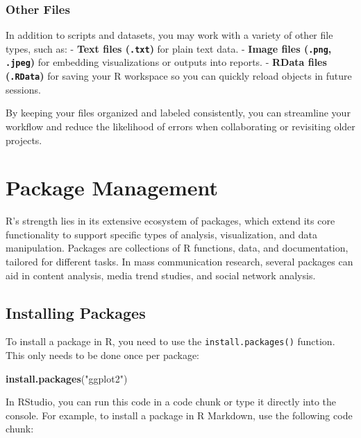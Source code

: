 \documentclass[
]{book}
\newenvironment{Shaded}{\begin{snugshade}}{\end{snugshade}}
\newcommand{\FunctionTok}[1]{\textcolor[rgb]{0.13,0.29,0.53}{\textbf{#1}}}
\newcommand{\NormalTok}[1]{#1}
\newcommand{\StringTok}[1]{\textcolor[rgb]{0.31,0.60,0.02}{#1}}
\begin{document}
\subsubsection*{Other Files}\label{other-files}

In addition to scripts and datasets, you may work with a variety of other file types, such as:
- \textbf{Text files (\texttt{.txt})} for plain text data.
- \textbf{Image files (\texttt{.png}, \texttt{.jpeg})} for embedding visualizations or outputs into reports.
- \textbf{RData files (\texttt{.RData})} for saving your R workspace so you can quickly reload objects in future sessions.

By keeping your files organized and labeled consistently, you can streamline your workflow and reduce the likelihood of errors when collaborating or revisiting older projects.

\section{Package Management}\label{package-management}

R's strength lies in its extensive ecosystem of packages, which extend its core functionality to support specific types of analysis, visualization, and data manipulation. Packages are collections of R functions, data, and documentation, tailored for different tasks. In mass communication research, several packages can aid in content analysis, media trend studies, and social network analysis.

\subsection*{Installing Packages}\label{installing-packages}

To install a package in R, you need to use the \texttt{install.packages()} function. This only needs to be done once per package:

\begin{Shaded}
\begin{Highlighting}[]
\FunctionTok{install.packages}\NormalTok{(}\StringTok{"ggplot2"}\NormalTok{)}
\end{Highlighting}
\end{Shaded}

In RStudio, you can run this code in a code chunk or type it directly into the console. For example, to install a package in R Markdown, use the following code chunk:
\end{document}

